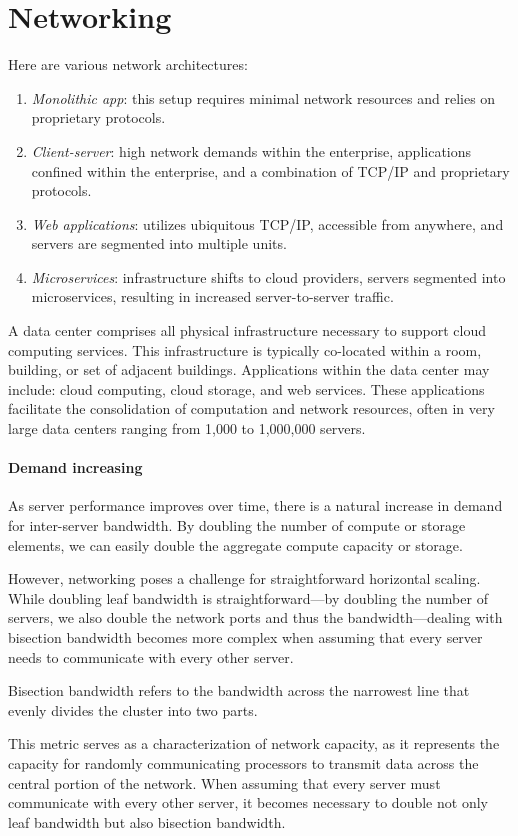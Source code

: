 \section{Networking}

Here are various network architectures:
\begin{enumerate}
    \item \textit{Monolithic app}: this setup requires minimal network resources and relies on proprietary protocols.
    \item \textit{Client-server}: high network demands within the enterprise, applications confined within the enterprise, and a combination of TCP/IP and proprietary protocols.
    \item \textit{Web applications}: utilizes ubiquitous TCP/IP, accessible from anywhere, and servers are segmented into multiple units.
    \item \textit{Microservices}: infrastructure shifts to cloud providers, servers segmented into microservices, resulting in increased server-to-server traffic.
\end{enumerate}
A data center comprises all physical infrastructure necessary to support cloud computing services. 
This infrastructure is typically co-located within a room, building, or set of adjacent buildings.
Applications within the data center may include: cloud computing, cloud storage, and web services. 
These applications facilitate the consolidation of computation and network resources, often in very large data centers ranging from 1,000 to 1,000,000 servers.

\paragraph*{Demand increasing}
As server performance improves over time, there is a natural increase in demand for inter-server bandwidth. 
By doubling the number of compute or storage elements, we can easily double the aggregate compute capacity or storage.

However, networking poses a challenge for straightforward horizontal scaling. 
While doubling leaf bandwidth is straightforward—by doubling the number of servers, we also double the network ports and thus the bandwidth—dealing with bisection bandwidth becomes more complex when assuming that every server needs to communicate with every other server.
\begin{definition}
    Bisection bandwidth refers to the bandwidth across the narrowest line that evenly divides the cluster into two parts. 
\end{definition}
This metric serves as a characterization of network capacity, as it represents the capacity for randomly communicating processors to transmit data across the central portion of the network. 
When assuming that every server must communicate with every other server, it becomes necessary to double not only leaf bandwidth but also bisection bandwidth.

